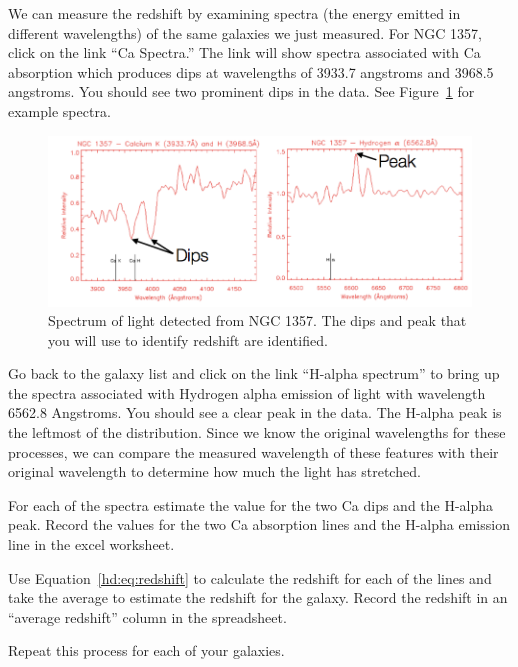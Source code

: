 We can measure the redshift by examining spectra (the energy emitted
in different wavelengths) of the same galaxies we just measured. For
NGC 1357, click on the link “Ca Spectra.” The link will show spectra
associated with Ca absorption which produces dips at wavelengths of
3933.7 angstroms and 3968.5 angstroms. You should see two
prominent dips in the data. See Figure~\ref{hd:fig:spectra} for example spectra.

\begin{figure}
	\centering
	\includegraphics[width=\textwidth]{hubble-diagram/spectra}
	\caption{Spectrum of light detected from NGC 1357. The dips and peak that you will use to identify redshift are identified.}\label{hd:fig:spectra}
\end{figure}

Go back to the galaxy list and click on the
link “H-alpha spectrum” to bring up the spectra associated with
Hydrogen alpha emission of light with wavelength 6562.8 Angstroms.
You should see a clear peak in the data. The H-alpha peak is the leftmost
of the distribution. Since we know the original wavelengths for these
processes, we can compare the measured wavelength of these features
with their original wavelength to determine how much the light has
stretched.

\begin{steps}
	\item For each of the spectra estimate the value for the two Ca dips and the H-alpha peak. Record the values for the two Ca absorption lines and the H-alpha emission line in the excel worksheet. 
	
	\item Use Equation~\ref{hd:eq:redshift} to calculate the redshift for each of the lines and take the average to
estimate the redshift for the galaxy. Record the redshift in an “average
redshift” column in the spreadsheet.

	\item Repeat this process for each of
your galaxies.
\end{steps}

